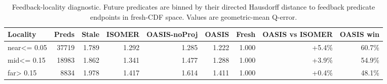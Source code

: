 \begin{table}[t]
  \centering
  \small
  \caption{Feedback-locality diagnostic. Future predicates are binned by their directed Hausdorff distance to feedback predicate endpoints in fresh-CDF space. Values are geometric-mean Q-error.}
  \label{tab:feedback_locality}
  \setlength{\tabcolsep}{4pt}
  \begin{tabular}{l | r | rrrrr | rr}
    \toprule
    Locality & Preds & Stale & ISOMER & OASIS-noProj & OASIS & Fresh & OASIS vs ISOMER & OASIS win \\
    \midrule
    near<= 0.05 & 37719 & 1.789 & 1.292 & 1.285 & 1.222 & 1.000 & +5.4\% & 60.7\% \\
    mid<= 0.15 & 18983 & 1.862 & 1.341 & 1.477 & 1.288 & 1.000 & +3.9\% & 54.9\% \\
    far> 0.15 & 8834 & 1.978 & 1.417 & 1.614 & 1.411 & 1.000 & +0.4\% & 48.1\% \\
    \bottomrule
  \end{tabular}
\end{table}
